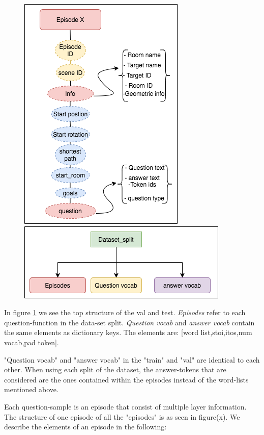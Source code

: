 \begin{figure}[H]
\centering
\includegraphics[scale=0.5]{images/episode1.png}
\includegraphics[scale=0.5]{images/datasplit1.png}
\label{fig:episode}
\caption{}
\end{figure}

In figure \ref{fig:episode} we see the top structure of the val and test. \textit{Episodes} refer to each question-function in the data-set split. \textit{Question vocab} and \textit{answer vocab} contain the same elements as dictionary keys. The elements are: [word list,stoi,itos,num vocab,pad token].

"Question vocab" and "answer vocab" in the "train" and "val" are identical to each other. When using each split of the dataset, the answer-tokens that are considered are the ones contained within the episodes instead of the word-lists mentioned above. 

Each question-sample is an episode that consist of multiple layer information. The structure of one episode of all the "episodes" is as seen in figure(x). We describe the elements of an episode in the following:  

